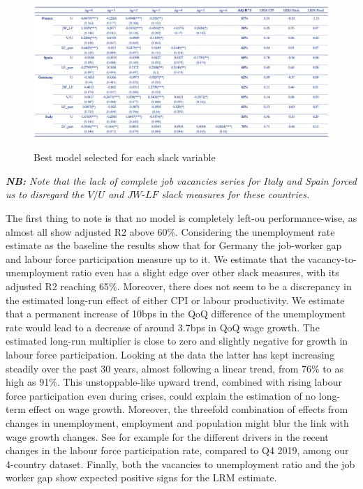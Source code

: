\begin{figure}[H]
    \centering
    \caption{Best model selected for each slack variable}
    \includegraphics[width=1\textwidth]{Core/2.Labour/img/LRM table.png}
    \label{figure:lrm_table}
\end{figure}
\vspace{-1.5cm}
\noindent \textit{\textbf{NB:} Note that the lack of complete job vacancies series for Italy and Spain forced us to disregard the $V/U$ and $JW\textrm{-}LF$ slack measures for these countries.}
\newpage

The first thing to note is that no model is completely left-ou performance-wise, as almost all show adjusted R2 above 60\%. 
Considering the unemployment rate estimate as the baseline the results show that for Germany the job-worker gap and labour force participation measure up to it. 
We estimate that the vacancy-to-unemployment ratio even has a slight edge over other slack measures, with its adjusted R2 reaching 65\%. 
Moreover, there does not seem to be a discrepancy in the estimated long-run effect of either CPI or labour productivity. 
We estimate that a permanent increase of 10bps in the QoQ difference of the unemployment rate would lead to a decrease of around 3.7bps in QoQ wage growth. 
The estimated long-run multiplier is close to zero and slightly negative for growth in labour force participation. 
Looking at the data the latter has kept increasing steadily over the past 30 years, almost following a linear trend, from 76\% to as high as 91\%. 
This unstoppable-like upward trend, combined with rising labour force participation even during crises, could explain the estimation of no long-term effect on wage growth. 
Moreover, the threefold combination of effects from changes in unemployment, employment and population might blur the link with wage growth changes. 
See for example  for the different drivers in the recent changes in the labour force participation rate, compared to Q4 2019, among our 4-country dataset. 
Finally, both the vacancies to unemployment ratio and the job worker gap show expected positive signs for the LRM estimate. 

